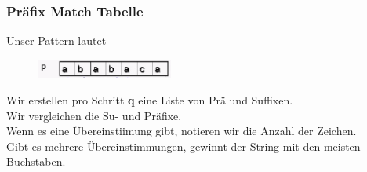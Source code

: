 \documentclass[a4paper,10pt]{report}
\begin{document}
\subsubsection{Präfix Match Tabelle}
Unser Pattern lautet
\begin{figure}[H]
	\begin{center}
  		\includegraphics[width=0.4\textwidth]{img/kmppattern.png}
	\end{center}
\end{figure}
\noindent
Wir erstellen pro Schritt \textbf{q} eine Liste von Prä und Suffixen.\\
Wir vergleichen die Su- und Präfixe.\\
Wenn es eine Übereinstiimung gibt, notieren wir die Anzahl der Zeichen.\\
Gibt es mehrere Übereinstimmungen, gewinnt der String mit den meisten Buchstaben.
\noindent
\end{document}
